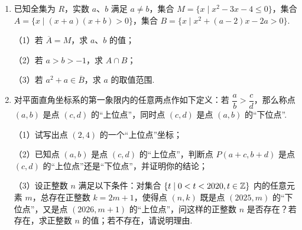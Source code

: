 \documentclass[a4paper,11pt]{article}
\begin{document}
\begin{enumerate}
\ansspace[6]

\item 已知全集为 $R$，实数 $a$、$b$ 满足 $a\neq b$，集合 $M=\{x\mid x^2-3x-4\leqslant0\}$，集合 $A=\{x\mid(x+a)(x+b)>0\}$，集合 $B=\{x\mid x^2+(a-2)x-2a>0\}$.

（1）若 $\overline A=M$，求 $a$、$b$ 的值；

（2）若 $a>b>-1$，求 $A\cap B$；

（3）若 $a^2+a\in\overline B$，求 $a$ 的取值范围.

\ifanswer
\solbegin
{}
\solend
\fi

\ansspace[8]

\item 对平面直角坐标系的第一象限内的任意两点作如下定义：若 $\dfrac ab>\dfrac cd$，那么称点 $(a,b)$ 是点 $(c,d)$ 的“上位点”，同时点 $(c,d)$ 是点 $(a,b)$ 的“下位点”.

（1）试写出点 $(2,4)$ 的一个“上位点”坐标；

（2）已知点 $(a,b)$ 是点 $(c,d)$ 的“上位点”，判断点 $P(a+c,b+d)$ 是点 $(c,d)$ 的“上位点”还是“下位点”，并证明你的结论；

（3）设正整数 $n$ 满足以下条件：对集合 $\{t\mid0<t<2020,t\in\mathbb{Z}\}$ 内的任意元素 $m$，总存在正整数 $k=2m+1$，使得点 $(n,k)$ 既是点 $(2025,m)$ 的“下位点”，又是点 $(2026,m+1)$ 的“上位点”，问这样的正整数 $n$ 是否存在？若存在，求正整数 $n$ 的值；若不存在，请说明理由.


\end{enumerate}
\end{document}
